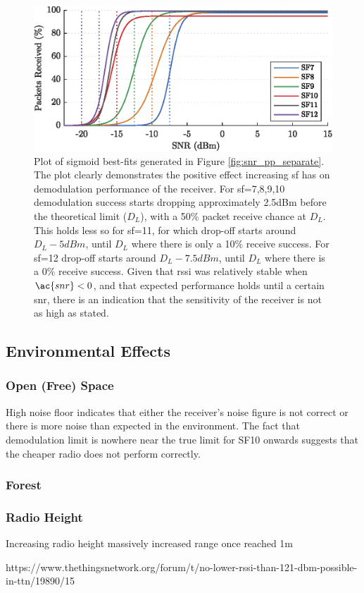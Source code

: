 \begin{figure}[H]
    \centering
   	\includegraphics{Figures/sf_fit_plot}
    \caption[Plot of sigmoid best-fits for \ac{snr} vs Packet Receive Percentage]{
    Plot of sigmoid best-fits generated in Figure \ref{fig:snr_pp_separate}. The plot clearly demonstrates the positive effect increasing \ac{sf} has on demodulation performance of the receiver. For \ac{sf}=7,8,9,10 demodulation success starts dropping approximately 2.5dBm before the theoretical limit ($D_L$), with a 50\% packet receive chance at $D_L$. This holds less so for \ac{sf}=11, for which drop-off starts around $D_L - 5dBm$, until $D_L$ where there is only a 10\% receive success. For \ac{sf}=12 drop-off starts around $D_L - 7.5dBm$, until $D_L$ where there is a 0\% receive success. Given that \ac{rssi} was relatively stable when $\ac{snr} < 0$, and that expected performance holds until a certain \ac{snr}, there is an indication that the sensitivity of the receiver is not as high as stated. 
     }
    \label{fig:sf_pp_fit}
\end{figure}

\subsection{Environmental Effects}
\subsubsection{Open (Free) Space}
High noise floor indicates that either the receiver's noise figure is not correct or there is more noise than expected in the environment. The fact that demodulation limit is nowhere near the true limit for SF10 onwards suggests that the cheaper radio does not perform correctly.
\subsubsection{Forest}
\subsubsection{Radio Height}
Increasing radio height massively increased range once reached 1m

https://www.thethingsnetwork.org/forum/t/no-lower-rssi-than-121-dbm-possible-in-ttn/19890/15
